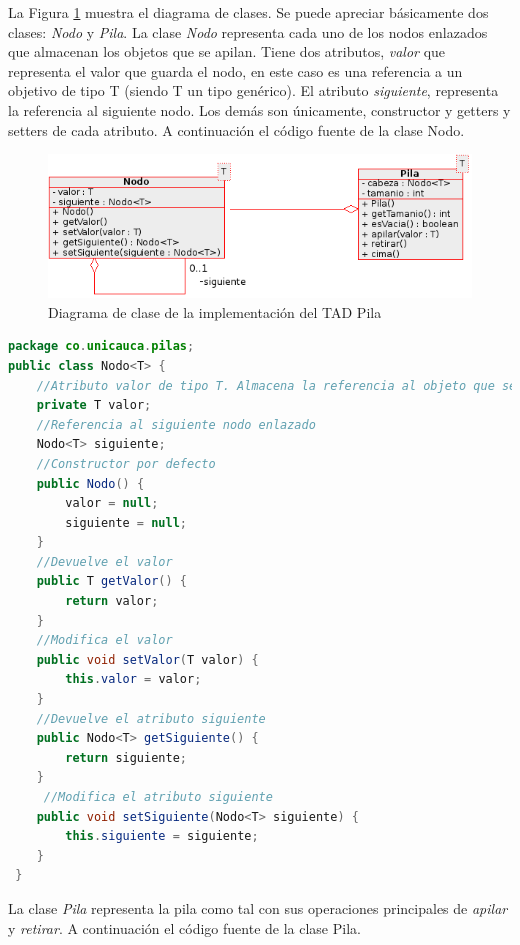 La Figura \ref{fig:pila-diagrama-clases} muestra el diagrama de clases. Se puede apreciar básicamente dos clases: \textit{Nodo} y \textit{Pila}. La clase \textit{Nodo} representa cada uno de los nodos enlazados que almacenan los objetos que se apilan. Tiene dos atributos,  \textsl{valor} que representa el valor que guarda el nodo, en este caso es una referencia a un objetivo de tipo T (siendo T un tipo genérico). El atributo \textsl{siguiente}, representa la referencia al siguiente nodo. Los demás son únicamente, constructor y getters y setters de cada atributo. A continuación el código fuente de la clase Nodo.


\begin{figure}
	\centering
		\includegraphics{images/DiagramaClases-Pila}
	\caption{Diagrama de clase de la implementación del TAD Pila}	
	\label{fig:pila-diagrama-clases}
\end{figure}

\begin{lstlisting}[language=Java]
package co.unicauca.pilas;
public class Nodo<T> {
	//Atributo valor de tipo T. Almacena la referencia al objeto que se guarda en el nodo
 	private T valor;
 	//Referencia al siguiente nodo enlazado
 	Nodo<T> siguiente;
	//Constructor por defecto
 	public Nodo() {
 		valor = null;
 		siguiente = null;
 	}
	//Devuelve el valor 
 	public T getValor() {
 		return valor;
 	}
	//Modifica el valor
 	public void setValor(T valor) {
 		this.valor = valor;
 	}
	//Devuelve el atributo siguiente
 	public Nodo<T> getSiguiente() {
 		return siguiente;
 	}
	 //Modifica el atributo siguiente
 	public void setSiguiente(Nodo<T> siguiente) {
 		this.siguiente = siguiente;
 	}
 }
\end{lstlisting}

La clase \textit{Pila} representa la pila como tal con sus operaciones principales de \textsl{apilar} y \textsl{retirar}. A continuación el código fuente de la clase Pila.

